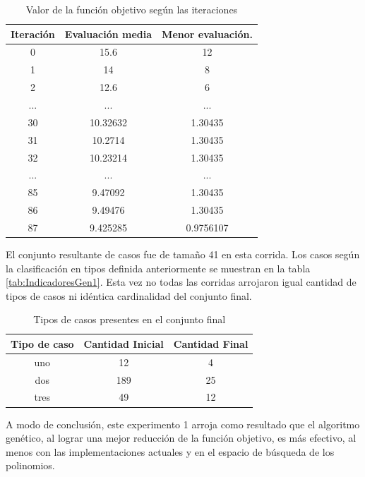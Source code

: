\documentclass[a4paper,12pt]{book}
\begin{document}
	\begin{table}[h]
		\begin{center}
			\begin{tabular}{| c | c | c |} \hline
				Iteración & Evaluación media & Menor evaluación. \\ \hline
				0 & 15.6 & 12 \\
				1 & 14 & 8 \\
				2 & 12.6 & 6 \\
				... & ... & ... \\
				30 & 10.32632 & 1.30435\\
				31 & 10.2714 & 1.30435\\
				32 & 10.23214 & 1.30435\\
				... & ... & ...\\
				85 & 9.47092 & 1.30435\\
				86 & 9.49476 & 1.30435\\
				87 & 9.425285 & 0.9756107 \\ \hline
			\end{tabular}
			\caption{Valor de la función objetivo según las iteraciones}
			\label{tab:foGen1}
		\end{center}
	\end{table}

	El conjunto resultante de casos fue de tamaño 41 en esta corrida. Los casos según la clasificación en tipos definida anteriormente se muestran en la tabla \ref{tab:IndicadoresGen1}. Esta vez no todas las corridas arrojaron igual cantidad de tipos de casos ni idéntica cardinalidad del conjunto final.

	\begin{table}[h]
		\begin{center}
			\begin{tabular}{| c | c | c |} \hline
				Tipo de caso & Cantidad Inicial & Cantidad Final \\ \hline
				uno & 12 & 4 \\
				dos & 189 & 25 \\
				tres & 49 & 12 \\ \hline
			\end{tabular}
			\caption{Tipos de casos presentes en el conjunto final}
			\label{tab:TiposdecasosGen1}
		\end{center}
	\end{table}

	A modo de conclusión, este experimento 1 arroja como resultado que el algoritmo genético, al lograr una mejor reducción de la función objetivo, es más efectivo, al menos con las implementaciones actuales y en el espacio de búsqueda de los polinomios.
\end{document}
